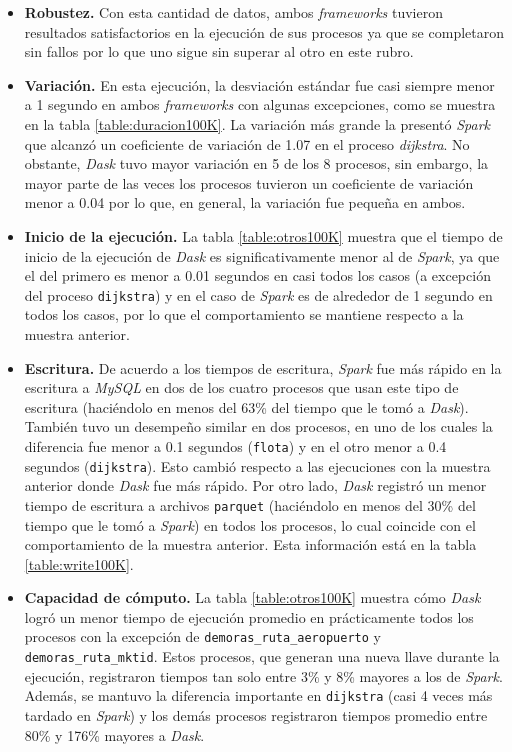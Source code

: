 \begin{itemize}
	\item \textbf{Robustez.} Con esta cantidad de datos, ambos \textit{frameworks} tuvieron resultados satisfactorios en la ejecución de sus procesos ya que se completaron sin fallos por lo que uno sigue sin superar al otro en este rubro.
	
	\item \textbf{Variación.} En esta ejecución, la desviación estándar fue casi siempre menor a 1 segundo en ambos \textit{frameworks} con algunas excepciones, como se muestra en la tabla \ref{table:duracion100K}. La variación más grande la presentó \textit{Spark} que alcanzó un coeficiente de variación de 1.07 en el proceso \textit{dijkstra}. No obstante, \textit{Dask} tuvo mayor variación en 5 de los 8 procesos, sin embargo, la mayor parte de las veces los procesos tuvieron un coeficiente de variación menor a 0.04 por lo que, en general, la variación fue pequeña en ambos.
	
	\item \textbf{Inicio de la ejecución.} La tabla \ref{table:otros100K} muestra que el tiempo de inicio de la ejecución de \textit{Dask} es significativamente menor al de \textit{Spark}, ya que el del primero es menor a 0.01 segundos en casi todos los casos (a excepción del proceso \texttt{dijkstra}) y en el caso de \textit{Spark} es de alrededor de 1 segundo en todos los casos, por lo que el comportamiento se mantiene respecto a la muestra anterior.
	
	\item \textbf{Escritura.} De acuerdo a los tiempos de escritura, \textit{Spark} fue más rápido en la escritura a \textit{MySQL} en dos de los cuatro procesos que usan este tipo de escritura (haciéndolo en menos del 63\% del tiempo que le tomó a \textit{Dask}). También tuvo un desempeño similar en dos procesos, en uno de los cuales la diferencia fue menor a 0.1 segundos (\texttt{flota}) y en el otro menor a 0.4 segundos (\texttt{dijkstra}). Esto cambió respecto a las ejecuciones con la muestra anterior donde \textit{Dask} fue más rápido. Por otro lado, \textit{Dask} registró un menor tiempo de escritura a archivos \texttt{parquet} (haciéndolo en menos del 30\% del tiempo que le tomó a \textit{Spark}) en todos los procesos, lo cual coincide con el comportamiento de la muestra anterior. Esta información está en la tabla \ref{table:write100K}.
	
	\item \textbf{Capacidad de cómputo.} La tabla \ref{table:otros100K} muestra cómo \textit{Dask} logró un menor tiempo de ejecución promedio en prácticamente todos los procesos con la excepción de \texttt{demoras\_ruta\_aeropuerto} y \texttt{demoras\_ruta\_mktid}. Estos procesos, que generan una nueva llave durante la ejecución, registraron tiempos tan solo entre 3\% y 8\% mayores a los de \textit{Spark}. Además, se mantuvo la diferencia importante en \texttt{dijkstra} (casi 4 veces más tardado en \textit{Spark}) y los demás procesos registraron tiempos promedio entre 80\% y 176\% mayores a \textit{Dask}.
	

\end{itemize}
